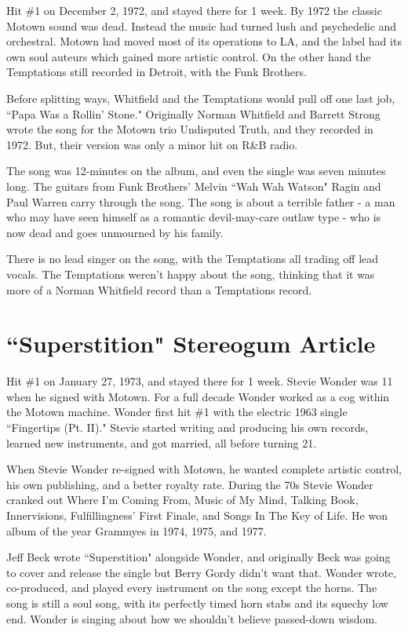 \documentclass[12pt, a4paper, twoside, openright, titlepage]{book}
\begin{document}
Hit \#1 on December 2, 1972, and stayed there for 1 week. By 1972 the classic Motown sound was dead. Instead the music had turned lush and psychedelic and orchestral. Motown had moved most of its operations to LA, and the label had its own soul auteurs which gained more artistic control. On the other hand the Temptations still recorded in Detroit, with the Funk Brothers. 

Before splitting ways, Whitfield and the Temptations would pull off one last job, ``Papa Was a Rollin' Stone." Originally Norman Whitfield and Barrett Strong wrote the song for the Motown trio Undisputed Truth, and they recorded in 1972. But, their version was only a minor hit on R\&B radio.

The song was 12-minutes on the album, and even the single was seven minutes long. The guitars from Funk Brothers' Melvin ``Wah Wah Watson" Ragin and Paul Warren carry through the song. The song is about a terrible father - a man who may have seen himself as a romantic devil-may-care outlaw type - who is now dead and goes unmourned by his family.

There is no lead singer on the song, with the Temptations all trading off lead vocals. The Temptations weren't happy about the song, thinking that it was more of a Norman Whitfield record than a Temptations record.



\section{``Superstition" Stereogum Article}

Hit \#1 on January 27, 1973, and stayed there for 1 week. Stevie Wonder was 11 when he signed with Motown. For a full decade Wonder worked as a cog within the Motown machine. Wonder first hit \#1 with the electric 1963 single ``Fingertips (Pt. II)." Stevie started writing and producing his own records, learned new instruments, and got married, all before turning 21. 

When Stevie Wonder re-signed with Motown, he wanted complete artistic control, his own publishing, and a better royalty rate. During the 70s Stevie Wonder cranked out Where I'm Coming From, Music of My Mind, Talking Book, Innervisions, Fulfillingness' First Finale, and Songs In The Key of Life. He won album of the year Grammyes in 1974, 1975, and 1977. 

Jeff Beck wrote ``Superstition" alongside Wonder, and originally Beck was going to cover and release the single but Berry Gordy didn't want that. Wonder wrote, co-produced, and played every instrument on the song except the horns. The song is still a soul song, with its perfectly timed horn stabs and its squechy low end. Wonder is singing about how we shouldn't believe passed-down wisdom. 
\end{document}
